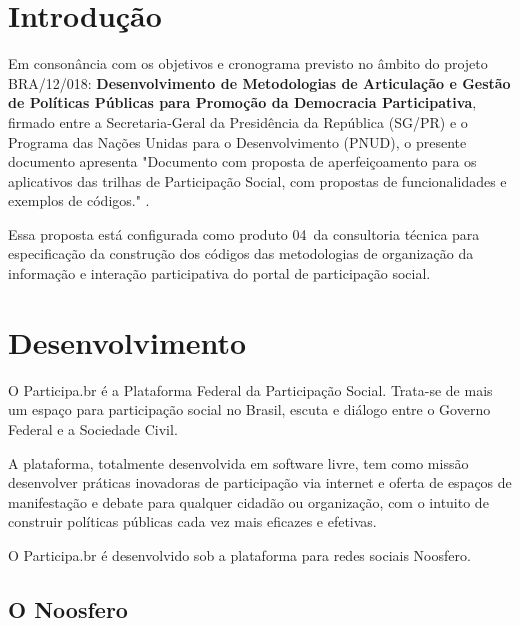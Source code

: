 \documentclass[12pt]{article}
\newcommand{\ProductNumber}{04}
\newcommand{\ProductDescription}{"Documento com proposta de aperfeiçoamento
  para os aplicativos das trilhas de Participação Social, com propostas de
  funcionalidades e exemplos de códigos."
}
\newcommand{\PalavrasChave}{observatório, tag, categoria, comentário, etiqueta, status}
\begin{document}



\tableofcontents
\newpage

\begin{abstract}
Proposta de ferramenta para acompanhamento de temas específicos do portal
Participa.br e ferramenta para sistematização de consultas a partir de debates
por comentários em parágrafos e trechos. \\

{\bf Palavras-chave:} \PalavrasChave.
\end{abstract}
\newpage

\section{Introdução}

Em consonância com os objetivos e cronograma previsto no âmbito do
projeto BRA/12/018:
\textbf{Desenvolvimento de Metodologias de Articulação e Gestão de
Políticas Públicas para Promoção da Democracia Participativa},
firmado entre a Secretaria-Geral da Presidência da República
(SG/PR) e o Programa das Nações Unidas para o Desenvolvimento (PNUD),
o presente documento apresenta \ProductDescription.

Essa proposta está configurada como produto \ProductNumber~da consultoria técnica
para especificação da construção dos códigos das metodologias de
organização da informação e interação participativa do portal de
participação social.

\section{Desenvolvimento}

O Participa.br é a Plataforma Federal da Participação Social. Trata-se de mais
um espaço para participação social no Brasil, escuta e diálogo entre o Governo
Federal e a Sociedade Civil. 

A plataforma, totalmente desenvolvida em software livre, tem como missão
desenvolver práticas inovadoras de participação via internet e oferta de
espaços de manifestação e debate para qualquer cidadão ou organização, com o
intuito de construir políticas públicas cada vez mais eficazes e efetivas.

O Participa.br é desenvolvido sob a plataforma para redes sociais Noosfero.

\subsection{O Noosfero}
\end{document}
